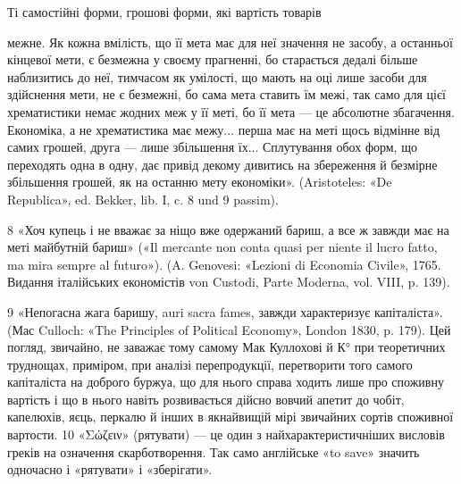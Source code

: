 Ті самостійні форми, грошові форми, які вартість товарів

межне. Як кожна вмілість, що її мета має для неї значення не засобу,
а останньої кінцевої мети, є безмежна у своєму прагненні, бо старається
дедалі більше наблизитись до неї, тимчасом як умілості, що мають на оці
лише засоби для здійснення мети, не є безмежні, бо сама мета ставить їм
межі, так само для цієї хрематистики немає жодних меж у її меті, бо її
мета — це абсолютне збагачення. Економіка, а не хрематистика має
межу... перша має на меті щось відмінне від самих грошей, друга — лише
збільшення їх... Сплутування обох форм, що переходять одна в одну, дає
привід декому дивитись на збереження й безмірне збільшення грошей,
як на останню мету економіки». (Aristoteles: «De Republica», ed. Bekker,
lib. I, c. 8 und 9 passim).

8 «Хоч купець і не вважає за ніщо вже одержаний бариш, а все ж
завжди має на меті майбутній бариш» («Il mercante non conta quasi per
niente il lucro fatto, ma mira sempre al futuro»). (A. Genovesi: «Lezioni
di Economia Civile», 1765. Видання італійських економістів von Custodi,
Parte Moderna, vol. VIII, p. 139).

9 «Непогасна жага баришу, auri sacra fames, завжди характеризує
капіталіста». (Мас Culloch: «The Principles of Political Economy»,
London 1830, p. 179). Цей погляд, звичайно, не заважає тому самому
Мак Куллохові й К° при теоретичних труднощах, приміром, при аналізі
перепродукції, перетворити того самого капіталіста на доброго буржуа,
що для нього справа ходить лише про споживну вартість і що в нього
навіть розвивається дійсно вовчий апетит до чобіт, капелюхів, яєць,
перкалю й інших в якнайвищій мірі звичайних сортів споживної вартости.
10 «Σώζειν» (рятувати) — це один з найхарактеристичніших висловів
греків на означення скарботворення. Так само англійське «to save» значить
одночасно і «рятувати» і «зберігати».
\parbreak{}  %
